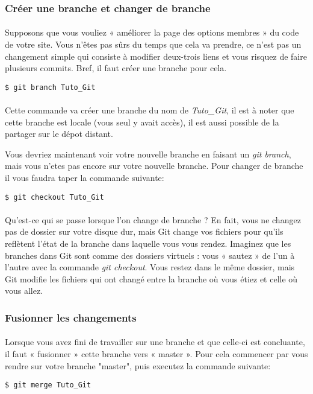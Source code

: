 \documentclass[french, a4paper, 12pt, titlepage]{article}
\begin{document}
\subsubsection{Créer une branche et changer de branche}
\paragraph{}Supposons que vous vouliez « améliorer la page des options membres » du code de votre site. Vous n’êtes pas sûrs du temps que cela va prendre, ce n’est pas un changement simple qui consiste à modifier deux-trois liens et vous risquez de faire plusieurs commits. Bref, il faut créer une branche pour cela.
\begin{lstlisting}
$ git branch Tuto_Git
\end{lstlisting}

\paragraph{}Cette commande va créer une branche du nom de \emph{Tuto\_Git}, il est à noter que cette branche est locale (vous seul y avait accès), il est aussi possible de la partager sur le dépot distant.

Vous devriez maintenant voir votre nouvelle branche en faisant un \emph{git branch}, mais vous n'etes pas encore sur votre nouvelle branche. Pour changer de branche il vous faudra taper la commande suivante:
\begin{lstlisting}
$ git checkout Tuto_Git
\end{lstlisting}

\paragraph{}Qu’est-ce qui se passe lorsque l’on change de branche ? En fait, vous ne changez pas de dossier sur votre disque dur, mais Git change vos fichiers pour qu’ils reflètent l’état de la branche dans laquelle vous vous rendez. Imaginez que les branches dans Git sont comme des dossiers virtuels : vous « sautez » de l’un à l’autre avec la commande \emph{git checkout}. Vous restez dans le même dossier, mais Git modifie les fichiers qui ont changé entre la branche où vous étiez et celle où vous allez.

\subsubsection{Fusionner les changements}
\paragraph{}Lorsque vous avez fini de travailler sur une branche et que celle-ci est concluante, il faut « fusionner » cette branche vers « master ». Pour cela commencer par vous rendre sur votre branche "master", puis executez la commande suivante:
\begin{lstlisting}
$ git merge Tuto_Git
\end{lstlisting}
\end{document}
